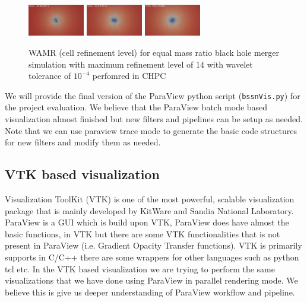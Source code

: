 \begin{figure}[H]
	\includegraphics[width=0.22\textwidth]{figs/paraview/r1/new/img_slice_level_000900.png}	
	\includegraphics[width=0.22\textwidth]{figs/paraview/r1/new/img_slice_level_001000.png}	
	\includegraphics[width=0.22\textwidth]{figs/paraview/r1/new/img_slice_level_001100.png}	
	\caption{WAMR (cell refinement level) for equal mass ratio black hole merger simulation with maximum refinement level of $14$ with wavelet tolerance of $10^{-4}$ perfomred in CHPC \label{fig:pv:r1_level}}
\end{figure}



We will provide the final version of the ParaView python script (\texttt{bssnVis.py}) for the project evaluation. We believe that the ParaView batch mode based visualization almost finished but new filters and pipelines can be setup as needed.
Note that we can use paraview trace mode to generate the basic code structures for new filters and modify them as needed. 

\subsection{VTK based visualization }
Visualization ToolKit (VTK) is one of the most powerful, scalable visualization package that is mainly developed by KitWare and Sandia National Laboratory. ParaView is a GUI which is build upon VTK, ParaView does have almost the basic functions, 
in VTK but there are some VTK functionalities that is not present in ParaView (i.e. Gradient Opacity Transfer functions). VTK is primarily supports in C/C++ there are some wrappers for other languages such as python tcl etc. In the VTK based visualization 
we are trying to perform the same visualizations that we have done using ParaView in parallel rendering mode. We believe this is give us deeper understanding of ParaView workflow and pipeline. 

